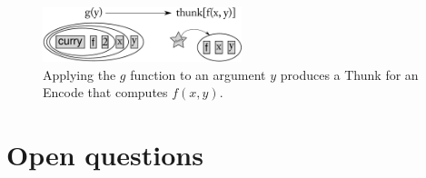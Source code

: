 \documentclass{article}
\newcommand{\encode}{\textrm{Encode}\xspace}
\newcommand{\thunk}{\textrm{Thunk}\xspace}
\begin{document}
\begin{figure}[h!]
  \begin{centering}
    \includegraphics[height=60px]{curry3.pdf}

  \end{centering}

  \caption{Applying the $g$ function to an argument $y$ produces a \thunk for an \encode that computes $f(x, y)$.}
  \label{fig:curry3}
\end{figure}

\section{Open questions}
\end{document}
